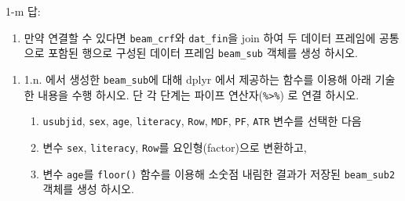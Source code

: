 \documentclass[
  11pt,
]{krantz}
\makeatletter
\providecommand{\tightlist}{%
  \setlength{\itemsep}{0pt}\setlength{\parskip}{0pt}}
\newenvironment{kframe}{%
\medskip{}
\setlength{\fboxsep}{.8em}
 \def\at@end@of@kframe{}%
 \ifinner\ifhmode%
  \def\at@end@of@kframe{\end{minipage}}%
  \begin{minipage}{\columnwidth}%
 \fi\fi%
 \def\FrameCommand##1{\hskip\@totalleftmargin \hskip-\fboxsep
 \colorbox{shadecolor}{##1}\hskip-\fboxsep
     \hskip-\linewidth \hskip-\@totalleftmargin \hskip\columnwidth}%
 \MakeFramed {\advance\hsize-\width
   \@totalleftmargin\z@ \linewidth\hsize
   \@setminipage}}%
 {\par\unskip\endMakeFramed%
 \at@end@of@kframe}
\renewenvironment{quote}{\begin{kframe}}{\end{kframe}}
\makeatother
\begin{document}
\begin{quote}
1-m 답:
\end{quote}

\begin{enumerate}
\def\labelenumi{\alph{enumi}.}
\setcounter{enumi}{13}
\tightlist
\item
  만약 연결할 수 있다면 \texttt{beam\_crf}와 \texttt{dat\_fin}을 join 하여 두 데이터 프레임에 공통으로 포함된 행으로 구성된 데이터 프레임 \texttt{beam\_sub} 객체를 생성 하시오.
\end{enumerate}

\footnotesize

\normalsize

\begin{enumerate}
\def\labelenumi{\alph{enumi}.}
\setcounter{enumi}{14}
\item
  1.n. 에서 생성한 \texttt{beam\_sub}에 대해 dplyr 에서 제공하는 함수를 이용해 아래 기술한 내용을 수행 하시오. 단 각 단계는 파이프 연산자(\texttt{\%\textgreater{}\%}) 로 연결 하시오.

  \begin{enumerate}
  \def\labelenumii{\arabic{enumii}.}
  \tightlist
  \item
    \texttt{usubjid}, \texttt{sex}, \texttt{age}, \texttt{literacy}, \texttt{Row}, \texttt{MDF}, \texttt{PF}, \texttt{ATR} 변수를 선택한 다음
  \item
    변수 \texttt{sex}, \texttt{literacy}, \texttt{Row}를 요인형(factor)으로 변환하고,
  \item
    변수 \texttt{age}를 \texttt{floor()} 함수를 이용해 소숫점 내림한 결과가 저장된 \texttt{beam\_sub2} 객체를 생성 하시오.
  \end{enumerate}
\end{enumerate}

\footnotesize

\normalsize
\end{document}
